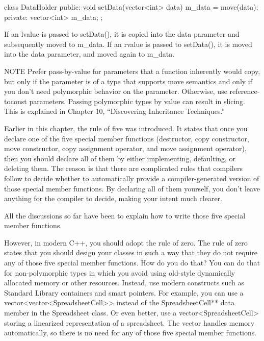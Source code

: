 \begin{cpp}
class DataHolder
{
    public:
        void setData(vector<int> data) { m_data = move(data); }
    private:
        vector<int> m_data;
};
\end{cpp}

If an lvalue is passed to setData(), it is copied into the data parameter and subsequently moved to m\_data. If an rvalue is passed to setData(), it is moved into the data parameter, and moved again to m\_data.

\begin{myNotic}{NOTE}
Prefer pass-by-value for parameters that a function inherently would copy, but only if the parameter is of a type that supports move semantics and only if you don’t need polymorphic behavior on the parameter. Otherwise, use reference-toconst parameters. Passing polymorphic types by value can result in slicing. This is explained in Chapter 10, “Discovering Inheritance Techniques.”
\end{myNotic}


Earlier in this chapter, the rule of five was introduced. It states that once you declare one of the five special member functions (destructor, copy constructor, move constructor, copy assignment operator, and move assignment operator), then you should declare all of them by either implementing, defaulting, or deleting them. The reason is that there are complicated rules that compilers follow to decide whether to automatically provide a compiler-generated version of those special member functions. By declaring all of them yourself, you don’t leave anything for the compiler to decide, making your intent much clearer.

All the discussions so far have been to explain how to write those five special member functions.

However, in modern C++, you should adopt the rule of zero. The rule of zero states that you should design your classes in such a way that they do not require any of those five special member functions. How do you do that? You can do that for non-polymorphic types in which you avoid using old-style dynamically allocated memory or other resources. Instead, use modern constructs such as Standard Library containers and smart pointers. For example, you can use a vector<vector<SpreadsheetCell>{}> instead of the SpreadsheetCell** data member in the Spreadsheet class. Or even better, use a vector<SpreadsheetCell> storing a linearized representation of a spreadsheet. The vector handles memory automatically, so there is no need for any of those five special member functions.

